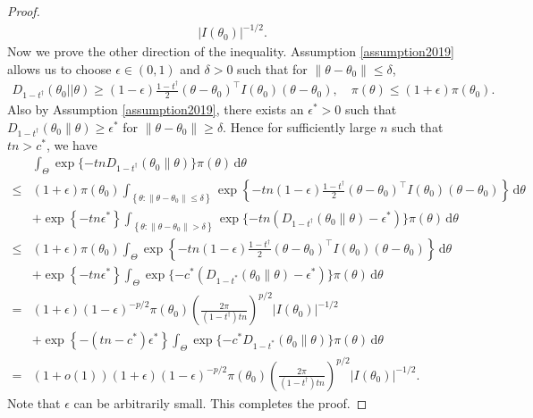\documentclass[11pt]{article}
\newcommand{\myT}{\intercal}
\theoremstyle{plain}
\theoremstyle{definition}
\theoremstyle{remark}
\begin{document}
\begin{appendices}
\begin{proof}
\begin{align*}
    |I(\theta_0)|^{-1/2}.
\end{align*}
Now we prove the other direction of the inequality.
Assumption \ref{assumption2019} allows us to choose $\epsilon \in (0,1)$ and $\delta>0$ such that  for $\|\theta- \theta_0\| \leq \delta$,
\begin{align*}
D_{1-t^\dagger} (\theta_0 || \theta) \geq (1-\epsilon) \frac{1-t^\dagger}{2} (\theta -\theta_0)^\myT I(\theta_0) (\theta - \theta_0)
,
\quad
\pi(\theta) \leq (1+\epsilon) \pi(\theta_0) 
.
\end{align*}
Also by Assumption \ref{assumption2019}, there exists an $\epsilon^* >0$ such that $D_{1 - t^\dagger} (\theta_0 \| \theta) \geq \epsilon^*$ for $\|\theta - \theta_0\|\geq \delta$.
Hence for sufficiently large $n$ such that $tn > c^*$, we have
\begin{align*}
        &\int_{ \Theta } \exp\{-tn D_{1-t^\dagger}(\theta_0 \| \theta)\} \pi (\theta) \, \mathrm d \theta
        \\
        \leq &
        (1+\epsilon) \pi(\theta_0)
        \int_{ \left\{ \theta: \|\theta - \theta_0\| \leq \delta \right\}}
        \exp\left\{ 
            -tn
        (1-\epsilon) \frac{1-t^\dagger}{2} (\theta -\theta_0)^\myT I(\theta_0) (\theta - \theta_0)
        \right\}
        \, \mathrm d \theta
        \\
        &+
        \exp\left\{ -tn \epsilon^* \right\}
        \int_{\left\{ \theta: \|\theta - \theta_0\| > \delta \right\}} \exp\{-tn \left(D_{1-t^\dagger}(\theta_0 \| \theta) -\epsilon^*\right)\} \pi (\theta) \, \mathrm d \theta
        \\
        \leq &
        (1+\epsilon) \pi(\theta_0)
        \int_{\Theta}
        \exp\left\{ 
            -tn
        (1-\epsilon) \frac{1-t^\dagger}{2} (\theta -\theta_0)^\myT I(\theta_0) (\theta - \theta_0)
        \right\}
        \, \mathrm d \theta
        \\
        &+
        \exp\left\{ -tn \epsilon^* \right\}
        \int_{\Theta} \exp\{-c^* \left(D_{1-t^*}(\theta_0 \| \theta) -\epsilon^*\right)\} \pi (\theta) \, \mathrm d \theta
        \\
        = &
        (1+\epsilon) (1-\epsilon)^{-p/2}  \pi(\theta_0) \left( \frac{2\pi}{(1-t^\dagger) tn } \right)^{p/2} |I(\theta_0)|^{-1/2}
        \\
        &+
        \exp\left\{ -(tn- c^*) \epsilon^* \right\}
        \int_{\Theta} \exp\{-c^* D_{1-t^*}(\theta_0 \| \theta) \} \pi (\theta) \, \mathrm d \theta
        \\
        = &
        (1+o(1))
        (1+\epsilon) (1-\epsilon)^{-p/2}  \pi(\theta_0) \left( \frac{2\pi}{(1-t^\dagger) tn } \right)^{p/2} |I(\theta_0)|^{-1/2}
        .
\end{align*}
Note that $\epsilon$ can be arbitrarily small. 
This completes the proof.
    

\end{proof}
\end{appendices}
\end{document}
